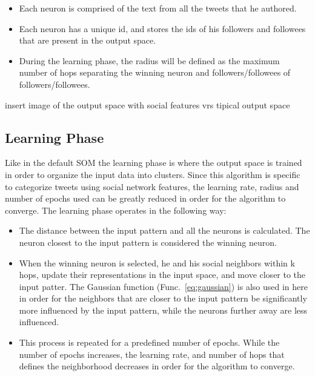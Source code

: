\begin{itemize}
  \item Each neuron is comprised of the text from all the tweets that he authored.
  \item Each neuron has a unique id, and stores the ids of his followers and followees that are present in the output space.
  \item During the learning phase, the radius will be defined as the maximum number of hops separating the winning neuron and followers/followees of followers/followees. 
\end{itemize}

{\color{red} insert image of the output space with social features vrs tipical output space}

\subsection{Learning Phase}
\label{sub:learning_phase}
Like in the default \ac{SOM} the learning phase is where the output space is trained in order to organize the input data into clusters. Since this algorithm is specific to categorize tweets using social network features, the learning rate, radius and number of epochs used can be greatly reduced in order for the algorithm to converge. The learning phase operates in the following way:

\begin{itemize}
  \item The distance between the input pattern and all the neurons is calculated. The neuron closest to the input pattern is considered the winning neuron.
  \item When the winning neuron is selected, he and his social neighbors within k hops, update their representations in the input space, and move closer to the input patter. The Gaussian function (Func.~\ref{eq:gaussian}) is also used in here in order for the neighbors that are closer to the input pattern be significantly more influenced by the input pattern, while the neurons further away are less influenced. 
  \item This process is repeated for a predefined number of epochs. While the number of epochs increases, the learning rate, and number of hops that defines the neighborhood decreases in order for the algorithm to converge.
\end{itemize}

